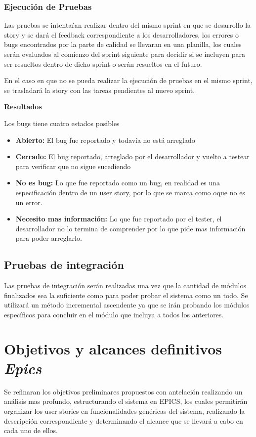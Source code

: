 \subsubsection {Ejecución de Pruebas}
Las pruebas se intentaŕan realizar dentro del mismo sprint en que se desarrollo la story y se dará el feedback correspondiente a los desarrolladores, los errores o bugs encontrados por la parte de calidad se llevaran en una planilla, los cuales serán evaluados al comienzo del sprint siguiente para decidir si se incluyen para ser resueltos dentro de dicho sprint o serán resueltos en el futuro.

En el caso en que no se pueda realizar la ejecución de pruebas en el mismo sprint, se trasladará la story con las tareas pendientes al nuevo sprint.

\textbf{Resultados}

Los bugs tiene cuatro estados posibles
\begin{itemize}
	\item \textbf{Abierto:} El bug fue reportado y todavía no está arreglado
    \item \textbf{Cerrado:} El bug reportado, arreglado por el desarrollador y vuelto a testear para verificar que no sigue sucediendo
    \item \textbf{No es bug:}  Lo que fue reportado como un bug, en realidad es una especificación dentro de un user story, por lo que se marca como oque no es un error.
    \item \textbf{Necesito mas información:} Lo que fue reportado por el tester, el desarrollador no lo termina de comprender por lo que pide mas información para poder arreglarlo.
\end{itemize}
\subsection{Pruebas de integración}
Las pruebas de integración serán realizadas una vez que la cantidad de módulos finalizados sea la suficiente como para poder probar el sistema como un todo. Se utilizará un método incremental ascendente ya que se irán probando los módulos específicos para concluir en el módulo que incluya a todos los anteriores.

\section{Objetivos y alcances definitivos \textit{Epics}}
 Se refinaran los objetivos preliminares propuestos con antelación realizando un análisis mas profundo, estructurando el sistema en EPICS, los cuales permitirán organizar los user stories en funcionalidades genéricas del sistema, realizando la descripción correspondiente y  determinando el alcance que se llevará a cabo en cada uno de ellos.
 
